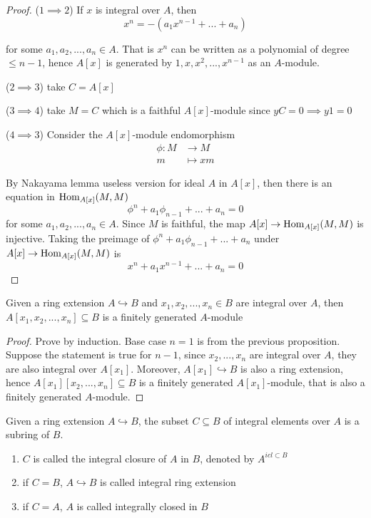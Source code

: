 \begin{proof}
	($1 \implies 2$) If $x$ is integral over $A$, then 
	$$
		x^n = - (a_1 x^{n-1} + ... + a_n)
	$$
	
	for some $a_1, a_2, ..., a_n \in A$. That is $x^n$ can be written as a polynomial of degree $\leq n-1$, hence $A[x]$ is generated by $1, x, x^2, ..., x^{n-1}$ as an $A$-module.
	
	($2 \implies 3$) take $C = A[x]$
	
	($3 \implies 4$) take $M = C$ which is a faithful $A[x]$-module since $yC = 0 \implies y1 = 0$
	
	($4 \implies 3$) Consider the $A[x]$-module endomorphism
	\begin{align*}
		\phi: M &\to M \\
					m &\mapsto xm
	\end{align*}
	
	By Nakayama lemma useless version for ideal $A$ in $A[x]$, then there is an equation in $\operatorname{Hom}_{A[x]}(M, M)$
	$$
		\phi^n + a_1 \phi_{n-1} + ... + a_n = 0
	$$
	for some $a_1, a_2, ..., a_n \in A$. Since $M$ is faithful, the map $A[x] \to \operatorname{Hom}_{A[x]}(M, M)$ is injective. Taking the preimage of $\phi^n + a_1 \phi_{n-1} + ... + a_n$ under $A[x] \to \operatorname{Hom}_{A[x]}(M, M)$ is
	$$
		x^n + a_1 x^{n-1} + ... + a_n = 0
	$$
\end{proof}

\begin{corollary}
	Given a ring extension $A \hookrightarrow B$ and $x_1, x_2, ..., x_n \in B$ are integral over $A$, then $A[x_1, x_2, ..., x_n] \subseteq B$ is a finitely generated $A$-module
\end{corollary}

\begin{proof}
	Prove by induction. Base case $n=1$ is from the previous proposition. Suppose the statement is true for $n - 1$, since $x_2, ..., x_n$ are integral over $A$, they are also integral over $A[x_1]$. Moreover, $A[x_1] \hookrightarrow B$ is also a ring extension, hence $A[x_1][x_2, ..., x_n] \subseteq B$ is a finitely generated $A[x_1]$-module, that is also a finitely generated $A$-module.
\end{proof}

\begin{definition}
	Given a ring extension $A \hookrightarrow B$, the subset $C \subseteq B$ of integral elements over $A$ is a subring of $B$.
	
	\begin{enumerate}
		\item $C$ is called the integral closure of $A$ in $B$, denoted by $A^{icl \subset B}$
		
		\item if $C = B$, $A \hookrightarrow B$ is called integral ring extension
		
		\item if $C = A$, $A$ is called integrally closed in $B$
	\end{enumerate}
\end{definition}

